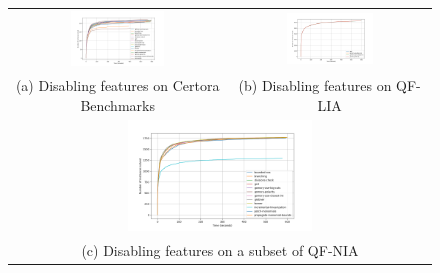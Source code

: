 \begin{figure}[htbp]
  \centering
  \begin{tabular}{cc}
    \includegraphics[width=0.45\textwidth]{../data/benchmark-submission.png} &
    \includegraphics[width=0.45\textwidth]{../data/qf-lia.png} \\
    (a) Disabling features on Certora Benchmarks &
    (b) Disabling features on QF-LIA \\
    \multicolumn{2}{c}{
      \includegraphics[width=0.45\textwidth]{../data/qf-nia-small.png}
    } \\
    \multicolumn{2}{c}{
      (c) Disabling features on a subset of QF-NIA
    } \\
  \end{tabular}
 
\end{figure}

